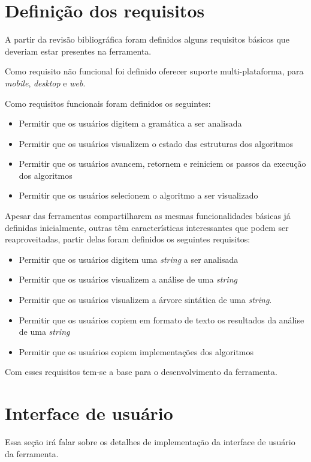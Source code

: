 \label{chap:metodologia}

\section{Definição dos requisitos}
A partir da revisão bibliográfica foram definidos alguns requisitos básicos que deveriam estar presentes na ferramenta. 

Como requisito não funcional foi definido oferecer suporte multi-plataforma, para \textit{mobile}, \textit{desktop} e \textit{web}. 

Como requisitos funcionais foram definidos os seguintes:
\begin{itemize}[label={$\sbullet$}]
    \item Permitir que os usuários digitem a gramática a ser analisada
    \item Permitir que os usuários visualizem o estado das estruturas dos algoritmos
    \item Permitir que os usuários avancem, retornem e reiniciem os passos da execução dos algoritmos  
    \item Permitir que os usuários selecionem o algoritmo a ser visualizado
\end{itemize}

Apesar das ferramentas compartilharem as mesmas funcionalidades básicas já definidas inicialmente, outras têm características interessantes que podem ser reaproveitadas, partir delas foram definidos os seguintes requisitos:
\begin{itemize}[label={$\sbullet$}]
    \item Permitir que os usuários digitem uma \textit{string} a ser analisada
    \item Permitir que os usuários visualizem a análise de uma \textit{string}
    \item Permitir que os usuários visualizem a árvore sintática de uma \textit{string}. 
    \item Permitir que os usuários copiem em formato de texto os resultados da análise de uma \textit{string}
    \item Permitir que os usuários copiem implementações dos algoritmos 
\end{itemize}
Com esses requisitos tem-se a base para o desenvolvimento da ferramenta.


\section{Interface de usuário}
Essa seção irá falar sobre os detalhes de implementação da interface de usuário da ferramenta. 

